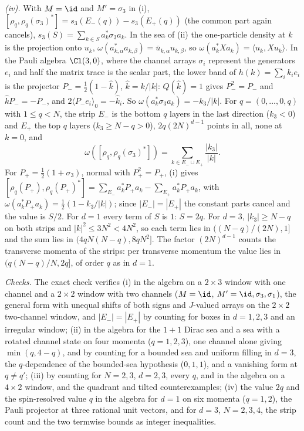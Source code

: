 \emph{(iv).} With $M = \id$ and $M' = \sigma_{3}$ in (i), $[\rho_{q}, \rho_{q}(\sigma_{3})^{*}] = s_{3}(E_{-}(q)) - s_{3}(E_{+}(q))$ (the common part again cancels), $s_{3}(S) = \sum_{k\in S}a_{k}^{*}\sigma_{3}a_{k}$. In the sea of (ii) the one-particle density at $k$ is the projection onto $u_{k}$, $\omega(a_{k,\alpha}^{*}a_{k,\beta}) = \bar u_{k,\alpha}u_{k,\beta}$, so $\omega(a_{k}^{*}Xa_{k}) = \langle u_{k}, Xu_{k}\rangle$. In the Pauli algebra $\Cl(3,0)$, where the channel arrays $\sigma_{i}$ represent the generators $e_{i}$ and half the matrix trace is the scalar part, the lower band of $h(k) = \sum_{i}k_{i}e_{i}$ is the projector $P_{-} = \tfrac12(1 - \hat k)$, $\hat k = k/|k|$: $Q(\hat k) = 1$ gives $P_{-}^{2} = P_{-}$ and $\hat kP_{-} = -P_{-}$, and $2\langle P_{-}e_{i}\rangle_{0} = -\hat k_{i}$. So $\omega(a_{k}^{*}\sigma_{3}a_{k}) = -k_{3}/|k|$. For $q = (0, \dots, 0, q)$ with $1 \le q < N$, the strip $E_{-}$ is the bottom $q$ layers in the last direction ($k_{3} < 0$) and $E_{+}$ the top $q$ layers ($k_{3} \ge N - q > 0$), $2q(2N)^{d-1}$ points in all, none at $k = 0$, and
\[
\omega([\rho_{q}, \rho_{q}(\sigma_{3})^{*}]) = \sum_{k\in E_{-}\cup E_{+}}\frac{|k_{3}|}{|k|} .
\]
For $P_{+} = \tfrac12(1 + \sigma_{3})$, normal with $P_{+}^{2} = P_{+}$, (i) gives $[\rho_{q}(P_{+}), \rho_{q}(P_{+})^{*}] = \sum_{E_{-}}a_{k}^{*}P_{+}a_{k} - \sum_{E_{+}}a_{k}^{*}P_{+}a_{k}$, with $\omega(a_{k}^{*}P_{+}a_{k}) = \tfrac12(1 - k_{3}/|k|)$; since $|E_{-}| = |E_{+}|$ the constant parts cancel and the value is $S/2$. For $d = 1$ every term of $S$ is $1$: $S = 2q$. For $d = 3$, $|k_{3}| \ge N - q$ on both strips and $|k|^{2} \le 3N^{2} < 4N^{2}$, so each term lies in $((N - q)/(2N), 1]$ and the sum lies in $(4qN(N - q), 8qN^{2}]$. The factor $(2N)^{d-1}$ counts the transverse momenta of the strips: per transverse momentum the value lies in $(q(N - q)/N, 2q]$, of order $q$ as in $d = 1$.

\emph{Checks.} The exact check verifies (i) in the algebra on a $2\times3$ window with one channel and a $2\times2$ window with two channels ($M = \id$, $M' = \id, \sigma_{3}, \sigma_{1}$), the general form with unequal shifts of both signs and $J$-valued arrays on the $2\times2$ two-channel window, and $|E_{-}| = |E_{+}|$ by counting for boxes in $d = 1, 2, 3$ and an irregular window; (ii) in the algebra for the $1 + 1$ Dirac sea and a sea with a rotated channel state on four momenta ($q = 1, 2, 3$), one channel alone giving $\min(q, 4 - q)$, and by counting for a bounded sea and uniform filling in $d = 3$, the $q$-dependence of the bounded-sea hypothesis ($0, 1, 1$), and a vanishing form at $q \ne q'$; (iii) by counting for $N = 2, 3$, $d = 2, 3$, every $q$, and in the algebra on a $4\times2$ window, and the quadrant and tilted counterexamples; (iv) the value $2q$ and the spin-resolved value $q$ in the algebra for $d = 1$ on six momenta ($q = 1, 2$), the Pauli projector at three rational unit vectors, and for $d = 3$, $N = 2, 3, 4$, the strip count and the two termwise bounds as integer inequalities.
